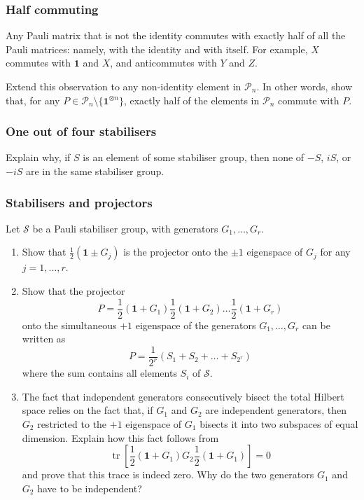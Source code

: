 \documentclass[fleqn]{article}
\providecommand{\tightlist}{%
  \setlength{\itemsep}{0pt}\setlength{\parskip}{0pt}}
\begin{document}
\hypertarget{half-commuting}{%
\subsubsection{Half commuting}\label{half-commuting}}

Any Pauli matrix that is not the identity commutes with exactly half of all the Pauli matrices: namely, with the identity and with itself.
For example, \(X\) commutes with \(\mathbf{1}\) and \(X\), and anticommutes with \(Y\) and \(Z\).

Extend this observation to any non-identity element in \(\mathcal{P}_n\).
In other words, show that, for any \(P\in\mathcal{P}_n\setminus\{\mathbf{1}^{\otimes n}\}\), exactly half of the elements in \(\mathcal{P}_n\) commute with \(P\).

\hypertarget{one-out-of-four-stabilisers}{%
\subsubsection{One out of four stabilisers}\label{one-out-of-four-stabilisers}}

Explain why, if \(S\) is an element of some stabiliser group, then none of \(-S\), \(iS\), or \(-iS\) are in the same stabiliser group.

\hypertarget{stabilisers-and-projectors}{%
\subsubsection{Stabilisers and projectors}\label{stabilisers-and-projectors}}

Let \(\mathcal{S}\) be a Pauli stabiliser group, with generators \(G_1,\ldots,G_r\).

\begin{enumerate}
\def\labelenumi{\arabic{enumi}.}
\tightlist
\item
  Show that \(\frac{1}{2}(\mathbf{1}\pm G_j)\) is the projector onto the \(\pm1\) eigenspace of \(G_j\) for any \(j=1,\ldots,r\).
\item
  Show that the projector
  \[
     P = \frac{1}{2}(\mathbf{1}+G_1)\frac{1}{2}(\mathbf{1}+G_2)\ldots\frac{1}{2}(\mathbf{1}+G_r)
   \]
  onto the simultaneous \(+1\) eigenspace of the generators \(G_1,\ldots,G_r\) can be written as
  \[
     P = \frac{1}{2^r}(S_1+S_2+\ldots+S_{2^r})
   \]
  where the sum contains all elements \(S_i\) of \(\mathcal{S}\).
\item
  The fact that independent generators consecutively bisect the total Hilbert space relies on the fact that, if \(G_1\) and \(G_2\) are independent generators, then \(G_2\) restricted to the \(+1\) eigenspace of \(G_1\) bisects it into two subspaces of equal dimension.
  Explain how this fact follows from
  \[
     \operatorname{tr}\left[
       \frac{1}{2}(\mathbf{1}+G_1)G_2\frac{1}{2}(\mathbf{1}+G_1)
     \right] = 0
   \]
  and prove that this trace is indeed zero.
  Why do the two generators \(G_1\) and \(G_2\) have to be independent?
\end{enumerate}
\end{document}
